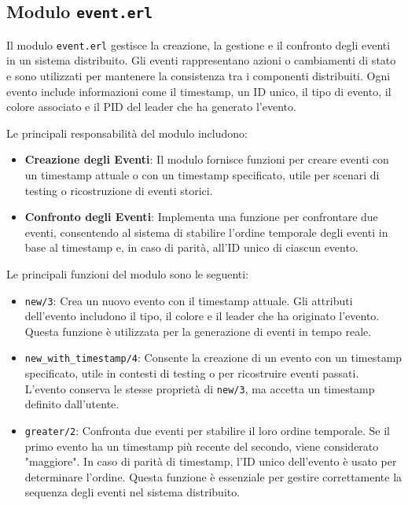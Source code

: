 \documentclass[12pt, a4paper]{report}
\begin{document}
\subsection{Modulo \texttt{event.erl}}

Il modulo \texttt{event.erl} gestisce la creazione, la gestione e il confronto degli eventi in un sistema distribuito. Gli eventi rappresentano azioni o cambiamenti di stato e sono utilizzati per mantenere la consistenza tra i componenti distribuiti. Ogni evento include informazioni come il timestamp, un ID unico, il tipo di evento, il colore associato e il PID del leader che ha generato l'evento.

Le principali responsabilità del modulo includono:

\begin{itemize}
    \item \textbf{Creazione degli Eventi}: Il modulo fornisce funzioni per creare eventi con un timestamp attuale o con un timestamp specificato, utile per scenari di testing o ricostruzione di eventi storici.

    \item \textbf{Confronto degli Eventi}: Implementa una funzione per confrontare due eventi, consentendo al sistema di stabilire l'ordine temporale degli eventi in base al timestamp e, in caso di parità, all'ID unico di ciascun evento.

\end{itemize}

\noindent
Le principali funzioni del modulo sono le seguenti:

\begin{itemize}
    \item \texttt{new/3}: Crea un nuovo evento con il timestamp attuale. Gli attributi dell'evento includono il tipo, il colore e il leader che ha originato l'evento. Questa funzione è utilizzata per la generazione di eventi in tempo reale.

    \item \texttt{new\_with\_timestamp/4}: Consente la creazione di un evento con un timestamp specificato, utile in contesti di testing o per ricostruire eventi passati. L'evento conserva le stesse proprietà di \texttt{new/3}, ma accetta un timestamp definito dall'utente.

    \item \texttt{greater/2}: Confronta due eventi per stabilire il loro ordine temporale. Se il primo evento ha un timestamp più recente del secondo, viene considerato "maggiore". In caso di parità di timestamp, l'ID unico dell'evento è usato per determinare l'ordine. Questa funzione è essenziale per gestire correttamente la sequenza degli eventi nel sistema distribuito.

\end{itemize}
\end{document}
